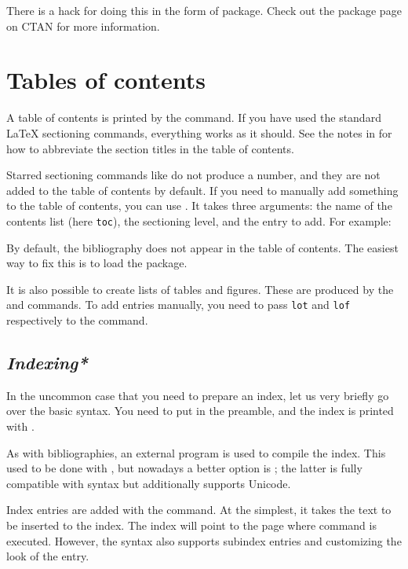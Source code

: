 There is a hack for doing this in the form of  package.
Check out the package page on CTAN for more information.




%
%
%
\section{Tables of contents}

A table of contents is printed by the  command.
If you have used the standard \LaTeX{} sectioning commands,
everything works as it should.
See the notes in 
for how to abbreviate the section titles in the table of contents.

Starred sectioning commands like  do not produce a number,
and they are not added to the table of contents by default.
If you need to manually add something to the table of contents,
you can use .
It takes three arguments:
the name of the contents list (here \verb|toc|), the sectioning level, and the entry to add.
For example:
\begin{ExampleCode}
\end{ExampleCode}

By default, the bibliography does not appear in the table of contents.
The easiest way to fix this is to load the  package.

It is also possible to create lists of tables and figures.
These are produced by the  and  commands.
To add entries manually, you need to pass \verb|lot| and \verb|lof|
respectively to the  command.


%
\subsection{\emph{Indexing*}}

In the uncommon case that you need to prepare an index,
let us very briefly go over the basic syntax.
You need to put  in the preamble,
and the index is printed with .

As with bibliographies, an external program is used to compile the index.
This used to be done with ,
but nowadays a better option is ;
the latter is fully compatible with  syntax
but additionally supports Unicode.

Index entries are added with the  command.
At the simplest, it takes the text to be inserted to the index.
The index will point to the page where command is executed.
However, the syntax also supports subindex entries
and customizing the look of the entry.


